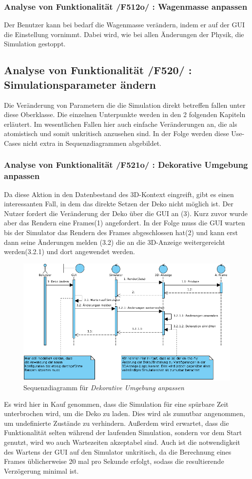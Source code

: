 \subsubsection{Analyse von Funktionalität /F512o/ :  Wagenmasse anpassen}
Der Benutzer kann bei bedarf die Wagenmasse verändern, indem er auf der GUI die Einstellung vornimmt. Dabei wird, wie bei allen Änderungen der Physik, die Simulation gestoppt.
\subsection{Analyse von Funktionalität /F520/ :  Simulationsparameter ändern}
Die Veränderung von Parametern die die Simulation direkt betreffen fallen unter diese Oberklasse. Die einzelnen Unterpunkte werden in den 2 folgenden Kapiteln erläutert. Im wesentlichen Fallen hier 
auch einfache Veränderungen an, die als atomistisch und somit unkritisch anzusehen sind. In der Folge werden diese Use-Cases nicht extra in Sequenzdiagrammen abgebildet.
\subsubsection{Analyse von Funktionalität /F521o/ :  Dekorative Umgebung anpassen}
Da diese Aktion in den Datenbestand des 3D-Kontext eingreift, gibt es einen interessanten Fall, in dem das direkte Setzen der Deko nicht möglich ist. 
Der Nutzer fordert die Veränderung der Deko über die GUI an (3). Kurz zuvor wurde aber das Rendern eine Frames(1) angefordert. 
In der Folge muss die GUI warten bis der Simulator das Rendern des Frames abgeschlossen hat(2) und kann erst dann seine Änderungen melden (3.2) die an die 3D-Anzeige weitergereicht werden(3.2.1) und dort angewendet werden.

\begin{figure}[h!]
\includegraphics[width=\linewidth]{bilder/change_graphic_deko}
\caption{Sequenzdiagramm für \textit{Dekorative Umgebung anpassen}}
\end{figure}
Es wird hier in Kauf genommen, dass die Simulation für eine spürbare Zeit unterbrochen wird, um die Deko zu laden. Dies wird als zumutbar angenommen, um undefinierte Zustände zu verhindern. 
Außerdem wird erwartet, dass die Funktionalität selten während der laufenden Simulation, sondern vor dem Start genutzt, wird wo auch Wartezeiten akzeptabel sind.
Auch ist die notwendigkeit des Wartens der GUI auf den Simulator unkritisch, da die Berechnung eines Frames üblicherweise 20 mal pro Sekunde erfolgt, sodass die resultierende Verzögerung minimal ist.

